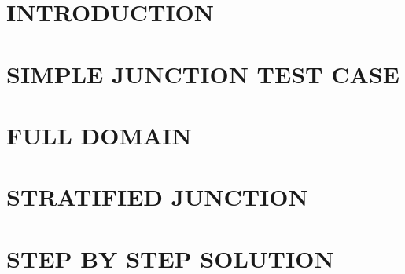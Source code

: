 \documentclass[a4paper,10pt,twoside]{csdoc}
\begin{document}
\def\contentsname{\textbf{\normalsize TABLE OF CONTENTS}\pdfbookmark[1]{Table of
contents}{contents}}
\def\indexname{Index of the main variables and keywords}

\large
\makepdgCS
\normalsize

\begin{center}\begin{singlespace}
\tableofcontents
\end{singlespace}\end{center}

%

%
%
\passepage
{}
\part{INTRODUCTION}

\setcounter{section}{0}
\part{SIMPLE JUNCTION TEST CASE}

\setcounter{section}{0}
\part{FULL DOMAIN}



\setcounter{section}{0}
\part{STRATIFIED JUNCTION}

\setcounter{section}{0}
\part{STEP BY STEP SOLUTION}





%
%

%
\end{document}
